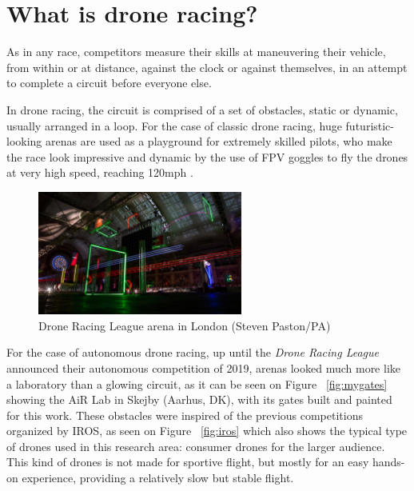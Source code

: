 \section{What is drone racing?}

As in any race, competitors measure their skills at maneuvering their vehicle,
from within or at distance, against the clock or against themselves, in an
attempt to complete a circuit before everyone else.

In drone racing, the circuit is comprised of a set of obstacles, static or
dynamic, usually arranged in a loop. For the case of classic drone racing, huge
futuristic-looking arenas are used as a playground for extremely skilled pilots,
who make the race look impressive and dynamic by the use of FPV goggles to fly
the drones at very high speed, reaching 120mph
\cite{https://thedroneracingleague.com/learn-more/}.

\begin{figure}[h]
	\centering
	\includegraphics[width=0.6\textwidth]{figure/drl_arena.jpg}
	\caption{Drone Racing League arena in London (Steven Paston/PA)}
\end{figure}

	
For the case of autonomous drone racing, up until the \emph{Drone Racing League}
announced their autonomous competition of 2019, arenas looked much more like a
laboratory than a glowing circuit, as it can be seen on Figure ~\ref{fig:mygates}
 showing the AiR Lab in Skejby (Aarhus, DK), with its gates
built and painted for this work. These obstacles were inspired of the previous
competitions organized by IROS, as seen on Figure ~\ref{fig:iros} which also
shows the typical type of drones used in this research area: consumer drones for
the larger audience. This kind of drones is not made for sportive flight, but
mostly for an easy hands-on experience, providing a relatively slow but stable
flight.

